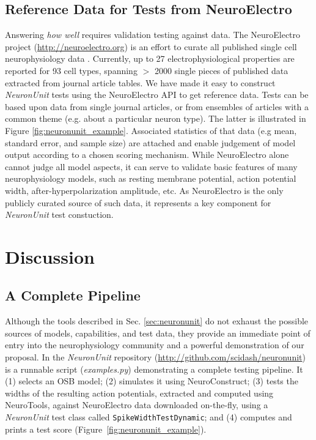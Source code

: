 \documentclass{frontiersSCNS}
\let\verbx\lstinline
\begin{document}
\subsection{Reference Data for Tests from NeuroElectro}
Answering \textit{how well} requires validation testing against data. 
The NeuroElectro project (\url{http://neuroelectro.org}) is an effort to curate all published single cell neurophysiology data \citep{tripathy_neuroelectro:_2012}.  
Currently, up to 27 electrophysiological properties are reported for 93 cell types, spanning $>$ 2000 single pieces of published data extracted from journal article tables. 
We have made it easy to construct \textit{NeuronUnit} tests using the NeuroElectro API to get reference data. 
Tests can be based upon data from single journal articles, or from ensembles of articles with a common theme (e.g. about a particular neuron type). 
The latter is illustrated in Figure \ref{fig:neuronunit_example}. 
Associated statistics of that data (e.g mean, standard error, and sample size) are attached and enable judgement of model output according to a chosen scoring mechanism. 
While NeuroElectro alone cannot judge all model aspects, it can serve to validate basic features of many neurophysiology models, such as resting membrane potential, action potential width, after-hyperpolarization amplitude, etc. 
As NeuroElectro is the only publicly curated source of such data, it represents a key component for \textit{NeuronUnit} test constuction.  

\section{Discussion}\label{sec:discussion}

\subsection{A Complete Pipeline}
Although the tools described in Sec. \ref{sec:neuronunit} do not exhaust the possible sources of models, capabilities, and test data, they provide an immediate point of entry into the neurophysiology community and a powerful demonstration of our proposal. 
In the \textit{NeuronUnit} repository (\url{http://github.com/scidash/neuronunit}) is a runnable script (\textit{examples.py}) demonstrating a complete testing pipeline. 
It (1) selects an OSB model; 
(2) simulates it using NeuroConstruct; 
(3) tests the widths of the resulting action potentials, extracted and computed using NeuroTools, against NeuroElectro data downloaded on-the-fly, using a \textit{NeuronUnit} test class called \verbx{SpikeWidthTestDynamic}; 
and (4) computes and prints a test score (Figure~\ref{fig:neuronunit_example}).
\end{document}
